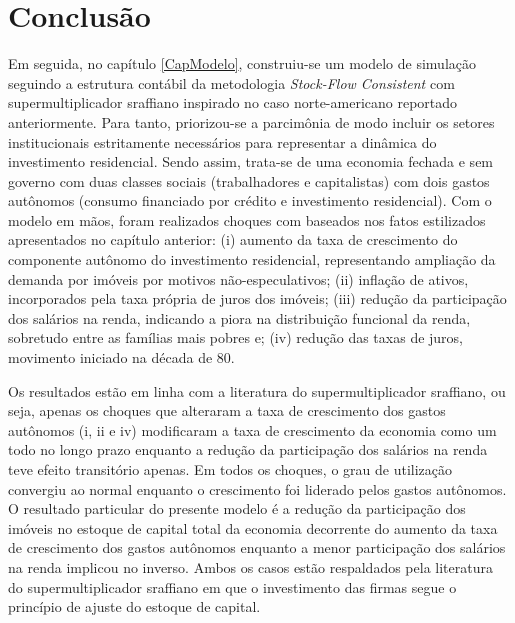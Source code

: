 \chapter{Conclusão}







Em seguida, no capítulo \ref{CapModelo}, construiu-se um modelo de simulação seguindo a estrutura contábil da metodologia \textit{Stock-Flow Consistent} com supermultiplicador sraffiano inspirado no caso norte-americano reportado anteriormente.
Para tanto, priorizou-se a parcimônia de modo incluir os setores institucionais estritamente necessários para representar a dinâmica do investimento residencial.
Sendo assim, trata-se de uma economia fechada e sem governo com duas classes sociais (trabalhadores e capitalistas) com dois gastos autônomos (consumo financiado por crédito e investimento residencial).
Com o modelo em mãos, foram realizados choques com baseados nos fatos estilizados apresentados no capítulo anterior: (i) aumento da taxa de crescimento do componente autônomo do investimento residencial, representando ampliação da demanda por imóveis por motivos não-especulativos; (ii) inflação de ativos, incorporados pela taxa própria de juros dos imóveis; (iii) redução da participação dos salários na renda, indicando a piora na distribuição funcional da renda, sobretudo entre as famílias mais pobres e; (iv) redução das taxas de juros, movimento iniciado na década de 80.


Os resultados estão em linha com a literatura do supermultiplicador sraffiano, ou seja, apenas os choques que alteraram a taxa de crescimento dos gastos autônomos (i, ii e iv) modificaram a taxa de crescimento da economia como um todo no longo prazo enquanto a redução da participação dos salários na renda teve efeito transitório apenas.
Em todos os choques, o grau de utilização convergiu ao normal enquanto o crescimento foi liderado pelos gastos autônomos.
O resultado particular do presente modelo é a redução da participação dos imóveis no estoque de capital total da economia decorrente do aumento da taxa de crescimento dos gastos autônomos enquanto a menor participação dos salários na renda implicou no inverso.
Ambos os casos estão respaldados pela literatura do supermultiplicador sraffiano em que o investimento das firmas segue o princípio de ajuste do estoque de capital.


